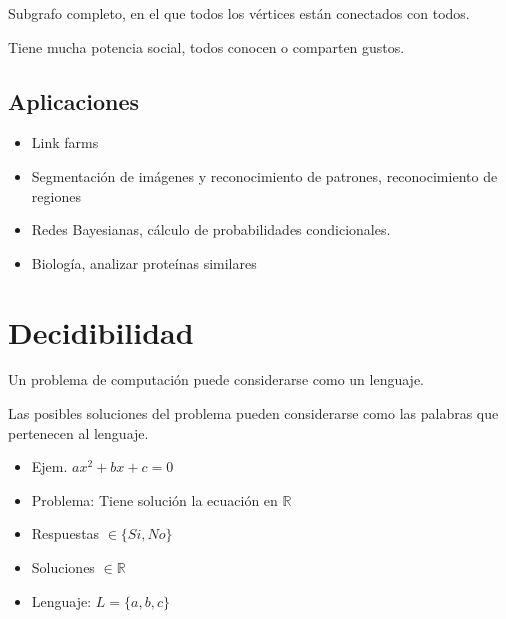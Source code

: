 Subgrafo completo, en el que todos los vértices están conectados con todos.

Tiene mucha potencia social, todos conocen o comparten gustos.

\subsection{Aplicaciones}
\begin{itemize}
	\item Link farms
	\item Segmentación de imágenes y reconocimiento de patrones, reconocimiento de regiones
	\item Redes Bayesianas, cálculo de probabilidades condicionales.
	\item Biología, analizar proteínas similares
\end{itemize}

\section{Decidibilidad}
Un problema de computación puede considerarse como un lenguaje.

Las posibles soluciones del problema pueden considerarse como las palabras que pertenecen al lenguaje.
\begin{itemize}
	\item Ejem. $ax^2+bx+c=0$
	\item Problema: Tiene solución la ecuación en $\mathbb{R}$
	\item Respuestas $\in \{Si, No\}$
	\item Soluciones $\in \mathbb{R}$
	\item Lenguaje: $L= \{a,b,c\}$
\end{itemize}

